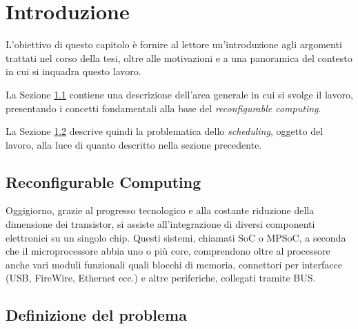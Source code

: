 \chapter{Introduzione}
\label{chap:intro}
\vspace{1cm}
L'obiettivo di questo capitolo è fornire al lettore un'introduzione agli argomenti 
trattati nel corso della tesi, oltre alle motivazioni e a una panoramica del contesto in 
cui si inquadra questo lavoro.

La Sezione \ref{sec:reconfComp} contiene una descrizione dell'area generale in cui si 
svolge il lavoro, presentando i concetti fondamentali alla base del \emph{reconfigurable 
computing}.

La Sezione \ref{sec:definizioneProblema} descrive quindi la problematica dello 
\emph{scheduling}, oggetto del lavoro, alla luce di quanto descritto nella sezione 
precedente.


\section{Reconfigurable Computing}
\label{sec:reconfComp}
Oggigiorno, grazie al progresso tecnologico e alla costante riduzione della dimensione 
dei transistor, si assiste all'integrazione di diversi componenti elettronici su un 
singolo chip. Questi sistemi, chiamati \ac{SoC} o \ac{MPSoC}, a seconda che il 
microprocessore abbia uno o più core, comprendono oltre al processore anche vari moduli 
funzionali quali blocchi di memoria, connettori per interfacce (USB, FireWire, Ethernet 
ecc.) e altre periferiche, collegati tramite BUS.


\section{Definizione del problema}
\label{sec:definizioneProblema}

